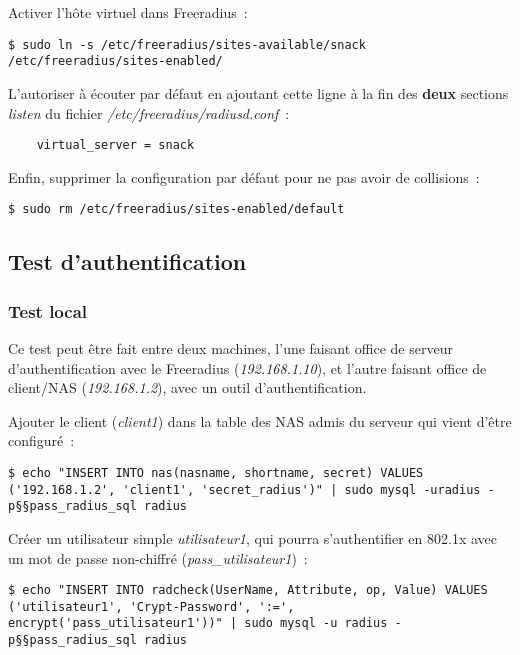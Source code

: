 Activer l'hôte virtuel dans Freeradius~:

\begin{lstlisting}
$ sudo ln -s /etc/freeradius/sites-available/snack /etc/freeradius/sites-enabled/
\end{lstlisting}

L'autoriser à écouter par défaut en ajoutant cette ligne à la fin des \textbf{deux} sections \emph{listen} du fichier \emph{/etc/freeradius/radiusd.conf}~:

\begin{lstlisting}
    virtual_server = snack
\end{lstlisting}

Enfin, supprimer la configuration par défaut pour ne pas avoir de collisions~:

\begin{lstlisting}
$ sudo rm /etc/freeradius/sites-enabled/default
\end{lstlisting}

\subsection{Test d'authentification}
\subsubsection{Test local}

Ce test peut être fait entre deux machines, l'une faisant office de serveur d'authentification avec le Freeradius (\emph{192.168.1.10}), et l'autre faisant office de client/NAS (\emph{192.168.1.2}), avec un outil d'authentification.

\label{ajout-nas}
Ajouter le client (\emph{client1}) dans la table des NAS admis du serveur qui vient d'être configuré~:

\begin{lstlisting}
$ echo "INSERT INTO nas(nasname, shortname, secret) VALUES ('192.168.1.2', 'client1', 'secret_radius')" | sudo mysql -uradius -p§§pass_radius_sql radius
\end{lstlisting}

\label{ajout-utilisateur-md5}
Créer un utilisateur simple \emph{utilisateur1}, qui pourra s'authentifier en 802.1x avec un mot de passe non-chiffré (\emph{pass\_utilisateur1})~:

\begin{lstlisting}
$ echo "INSERT INTO radcheck(UserName, Attribute, op, Value) VALUES ('utilisateur1', 'Crypt-Password', ':=', encrypt('pass_utilisateur1'))" | sudo mysql -u radius -p§§pass_radius_sql radius
\end{lstlisting}

